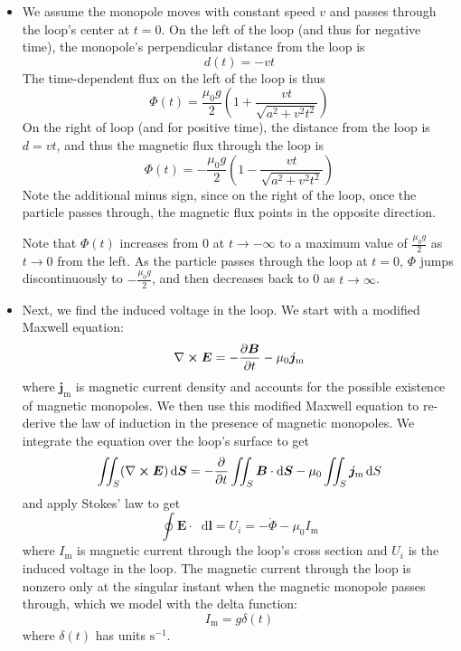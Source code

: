 \documentclass[11pt, a4paper]{article}
\newcommand{\diff}{\mathop{}\!\mathrm{d}} %
\renewcommand{\vec}[1]{\bm{#1}} %
\newcommand{\E}{\vec{E}}  %
\newcommand{\B}{\vec{B}}  %
\newcommand{\mm}{\mu_{0}}  %
\newcommand{\m}{\vec{m}}  %
\renewcommand{\curl}{\nabla \cross}
\begin{document}
\begin{itemize}
	\item We assume the monopole moves with constant speed $ v $ and passes through the loop's center at $ t = 0 $. On the left of the loop (and thus for negative time), the monopole's perpendicular distance from the loop is
	\begin{equation*}
		d(t) = - vt
	\end{equation*}
	The time-dependent flux on the left of the loop is thus
	\begin{equation*}
		\Phi(t) = \frac{\mm g}{2}\left(1 + \frac{vt}{\sqrt{a^{2} +v^{2}t^{2}}}\right)
	\end{equation*}
	On the right of loop (and for positive time), the distance from the loop is $ d = vt $, and thus the magnetic flux through the loop is
	\begin{equation*}
		\Phi(t) = -\frac{\mm g}{2}\left(1 - \frac{vt}{\sqrt{a^{2} +v^{2}t^{2}}}\right)
	\end{equation*}
	Note the additional minus sign, since on the right of the loop, once the particle passes through, the magnetic flux points in the opposite direction.
	
	Note that $ \Phi(t) $ increases from $ 0 $ at $ t \to -\infty $ to a maximum value of $ \frac{\mm g}{2} $ as $ t \to 0 $ from the left. As the particle passes through the loop at $ t = 0 $, $ \Phi $ jumps discontinuously to $ - \frac{\mm g}{2}  $, and then decreases back to 0 as $ t \to \infty $. 
	
	\item Next, we find the induced voltage in the loop. We start with a modified Maxwell equation:
	\begin{equation*}
		\curl \E = - \pdv{\B}{t} - \mm \vec{j}_{\text{m}}
	\end{equation*}
	where $ \vec{j}_{\text{m}} $ is magnetic current density and accounts for the possible existence of magnetic monopoles. We then use this modified Maxwell equation to re-derive the law of induction in the presence of magnetic monopoles. We integrate the equation over the loop's surface to get
	\begin{equation*}
		\iint_{S} (\curl \E)\diff \vec{S} = - \pdv{t}\iint_{S} \B \cdot \diff \vec{S} - \mm \iint_{S} \vec{j}_{\text{m}}\diff S 
	\end{equation*}
	and apply Stokes' law to get
	\begin{equation*}
		\oint \E \cdot \diff \vec{l} = U_{i} = - \dot{\Phi} - \mm I_{\text{m}}
	\end{equation*}
	where $ I_{\text{m}} $ is magnetic current through the loop's cross section and $ U_{i} $ is the induced voltage in the loop. The magnetic current through the loop is nonzero only at the singular instant when the magnetic monopole passes through, which we model with the delta function:
	\begin{equation*}
		I_{\text{m}} = g \delta (t)
	\end{equation*}
	where $ \delta(t) $ has units $ \si{\second^{-1}} $. 
	

\end{itemize}
\end{document}
